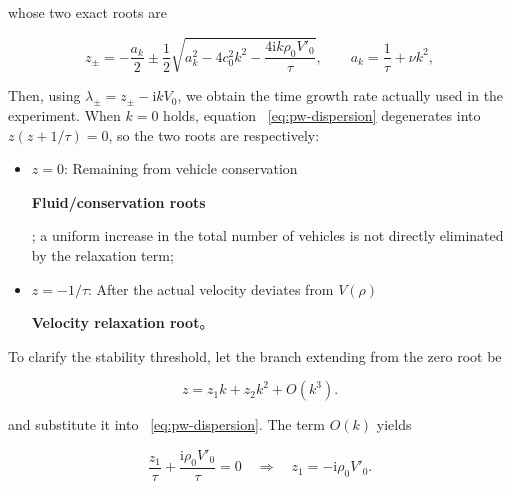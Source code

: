 \documentclass[11pt,a4paper,openany]{book}
\numberwithin{equation}{chapter}
\numberwithin{figure}{chapter}
\numberwithin{table}{chapter}
\begin{document}
whose two exact roots are

\begin{equation}
z_{\pm}
=-\frac{a_k}{2}
\pm\frac12\sqrt{a_k^2-4c_0^2k^2-
\frac{4\mathrm{i}k\rho_0V'_0}{\tau}},
\qquad a_k=\frac1\tau+\nu k^2,
\label{eq:pw-exact-roots}
\end{equation}

Then, using $\lambda_\pm=z_\pm-\mathrm{i}kV_0$, we obtain the time growth rate actually used in the experiment. When $k=0$ holds, equation ~\eqref{eq:pw-dispersion} degenerates into $z(z+1/\tau)=0$, so the two roots are respectively:







\begin{itemize}[leftmargin=1.4em,itemsep=2pt]
\item




 $z=0$: Remaining from vehicle conservation




\textbf{Fluid/conservation roots}




; a uniform increase in the total number of vehicles is not directly eliminated by the relaxation term;







\item




 $z=-1/\tau$: After the actual velocity deviates from $V(\rho)$




\textbf{Velocity relaxation root}。
\end{itemize}





To clarify the stability threshold, let the branch extending from the zero root be

\begin{equation}
z=z_1k+z_2k^2+O(k^3).
\end{equation}

and substitute it into ~\eqref{eq:pw-dispersion}. The term $O(k)$ yields

\begin{equation}
\frac{z_1}{\tau}+\frac{\mathrm{i}\rho_0V'_0}{\tau}=0
\quad\Longrightarrow\quad
z_1=-\mathrm{i}\rho_0V'_0.
\end{equation}
\end{document}
